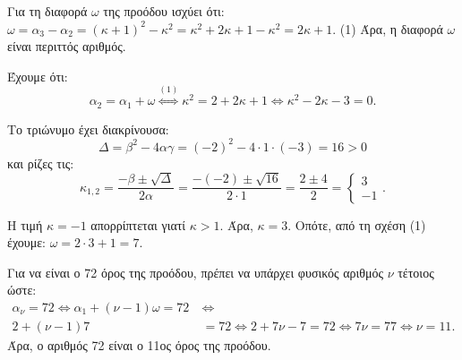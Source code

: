 
\begin{alist}
\item Για τη διαφορά $\omega$ της προόδου ισχύει ότι:
$\omega = \alpha_3 - \alpha_2 = (\kappa + 1)^2 - \kappa^2 = \kappa^2 + 2\kappa + 1 - \kappa^2 = 2\kappa + 1$. (1)
Άρα, η διαφορά $\omega$ είναι περιττός αριθμός.

\item 
\begin{rlist}
\item Έχουμε ότι:
\[\alpha_2 = \alpha_1 + \omega \stackrel{(1)}{\Leftrightarrow} \kappa^2 = 2 + 2\kappa + 1 \Leftrightarrow \kappa^2 - 2\kappa - 3 = 0.\]

Το τριώνυμο έχει διακρίνουσα:
\[\Delta = \beta^2 - 4\alpha\gamma = (-2)^2 - 4 \cdot 1 \cdot (-3) = 16 > 0\]
και ρίζες τις:
\[\kappa_{1,2} = \dfrac{-\beta \pm \sqrt{\Delta}}{2\alpha} = \dfrac{-(-2) \pm \sqrt{16}}{2 \cdot 1} = \dfrac{2 \pm 4}{2} = \begin{cases} 3 \\ -1 \end{cases}.\]

Η τιμή $\kappa = -1$ απορρίπτεται γιατί $\kappa > 1$. Άρα, $\kappa = 3$. Οπότε, από τη σχέση (1) έχουμε:
$\omega = 2 \cdot 3 + 1 = 7$.

\item Για να είναι ο 72 όρος της προόδου, πρέπει να υπάρχει φυσικός αριθμός $\nu$ τέτοιος ώστε:
\begin{align*}
\alpha_\nu = 72 \Leftrightarrow \alpha_1 + (\nu - 1)\omega = 72 \ &\Leftrightarrow \\
2 + (\nu - 1)7 &= 72 \Leftrightarrow 2 + 7\nu - 7 = 72 \Leftrightarrow 7\nu = 77 \Leftrightarrow \nu = 11.
\end{align*}
Άρα, ο αριθμός 72 είναι ο 11ος όρος της προόδου.
\end{rlist}
\end{alist}

